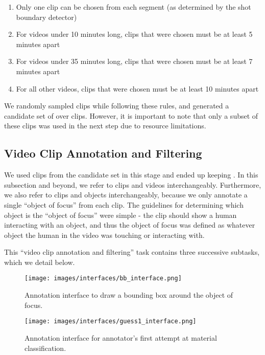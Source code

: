 \documentclass[runningheads]{llncs}
\begin{document}
\begin{enumerate}
    \item Only one clip can be chosen from each segment (as determined by the shot boundary detector) 
    \item For videos under 10 minutes long, clips that were chosen must be at least 5 minutes apart
    \item For videos under 35 minutes long, clips that were chosen must be at least 7 minutes apart
    \item For all other videos, clips that were chosen must be at least 10 minutes apart
\end{enumerate}

We randomly sampled clips while following these rules, and generated a candidate set of over  clips. However, it is important to note that only a subset of these clips was used in the next step due to resource limitations. 

\subsection{Video Clip Annotation and Filtering} \label{appendix:data2}

We used  clips from the candidate set in this stage and ended up keeping . In this subsection and beyond, we refer to clips and videos interchangeably. Furthermore, we also refer to clips and objects interchangeably, because we only annotate a single ``object of focus'' from each clip. The guidelines for determining which object is the ``object of focus'' were simple - the clip should show a human interacting with an object, and thus the object of focus was defined as whatever object the human in the video was touching or interacting with.

This ``video clip annotation and filtering'' task contains three successive subtasks, which we detail below.

\begin{figure}[t]
    \centering
  \texttt{[image: images/interfaces/bb\_interface.png]}
  \caption{Annotation interface to draw a bounding box around the object of focus.}
  \label{fig:bb_interface}
\end{figure}

\begin{figure}[t]
    \centering
  \texttt{[image: images/interfaces/guess1\_interface.png]}
  \caption{Annotation interface for annotator's first attempt at material classification.}
  \label{fig:guess1_interface}
\end{figure}
\end{document}
